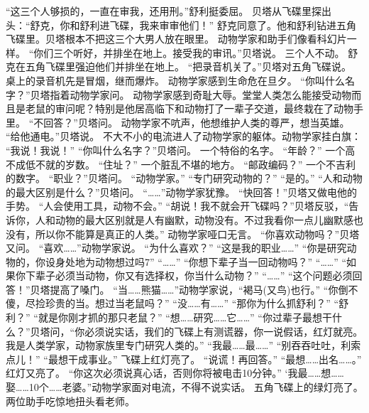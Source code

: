 \documentclass[a4paper,12pt,UTF8,twoside]{ctexbook}
\begin{document}
        “这三个人够损的，一直在审我，还用刑。”舒利挺委屈。 
        贝塔从飞碟里探出头：“舒克，你和舒利进飞碟，我来审审他们！” 
        舒克同意了。他和舒利钻进五角飞碟里。贝塔根本不把这三个大男人放在眼里。 
        动物学家和助手们像看科幻片一样。 
        “你们三个听好，并排坐在地上。接受我的审讯。”贝塔说。 
        三个人不动。 
        舒克在五角飞碟里强迫他们并排坐在地上。 
        “把录音机关了。”贝塔对五角飞碟说。 
        桌上的录音机先是冒烟，继而爆炸。 
        动物学家感到生命危在旦夕。 
        “你叫什么名字？”贝塔指着动物学家问。 
        动物学家感到奇耻大辱。堂堂人类怎么能接受动物而且是老鼠的审问呢？特别是他居高临下和动物打了一辈子交道，最终栽在了动物手里。 
        “不回答？”贝塔问。 
        动物学家不吭声，他想维护人类的尊严，想当英雄。 
        “给他通电。”贝塔说。 
        不大不小的电流进人了动物学家的躯体。动物学家挂白旗： 
        “我说！我说！” 
        “你叫什么名字？”贝塔问。 
        一个特俗的名字。 
        “年龄？” 
        一个高不成低不就的岁数。 
        “住址？” 
        一个脏乱不堪的地方。 
        “邮政编码？” 
        一个不吉利的数字。 
        “职业？”贝塔问。 
        “动物学家。” 
        “专门研究动物的？” 
        “是的。” 
        “人和动物的最大区别是什么？”贝塔问。 
        “……”动物学家犹豫。 
        “快回答！”贝塔又做电他的手势。 
        “人会使用工具，动物不会。” 
        “胡说！我不就会开飞碟吗？”贝塔反驳，“告诉你，人和动物的最大区别就是人有幽默，动物没有。不过我看你一点儿幽默感也没有，所以你不能算是真正的人类。” 
        动物学家哑口无言。 
        “你喜欢动物吗？”贝塔又问。 
        “喜欢……”动物学家说。 
        “为什么喜欢？” 
        “这是我的职业……” 
        “你是研究动物的，你设身处地为动物想过吗7” 
        “……” 
        “你想下辈子当一回动物吗？” 
        “……” 
        “如果你下辈子必须当动物，你又有选择权，你当什么动物？” 
        “……” 
        “这个问题必须回答！”贝塔提高了嗓门。 
        “当……熊猫……”动物学家说，“褐马(又鸟)也行。” 
        “你倒不傻，尽捡珍贵的当。想过当老鼠吗？” 
        “没……有……” 
        “那你为什么抓舒利？” 
        “舒利？” 
        “就是你刚才抓的那只老鼠？” 
        “想……研究……它……” 
        “你过辈子最想干什么？”贝塔问，“你必须说实话，我们的飞碟上有测谎器，你一说假话，红灯就亮。我是人类学家，动物家族里专门研究人类的。” 
        “我最……最……” 
        “别吞吞吐吐，利索点儿！” 
        “最想干成事业。” 
        飞碟上红灯亮了。 
        “说谎！再回答。” 
        “最想……出名……。” 
        红灯又亮了。 
        “你这次必须说真心话，否则你将被电击10分钟。” 
        ‘我最……想……娶……10个……老婆。”动物学家面对电流，不得不说实话。 
        五角飞碟上的绿灯亮了。 
        两位助手吃惊地扭头看老师。 
\end{document}
